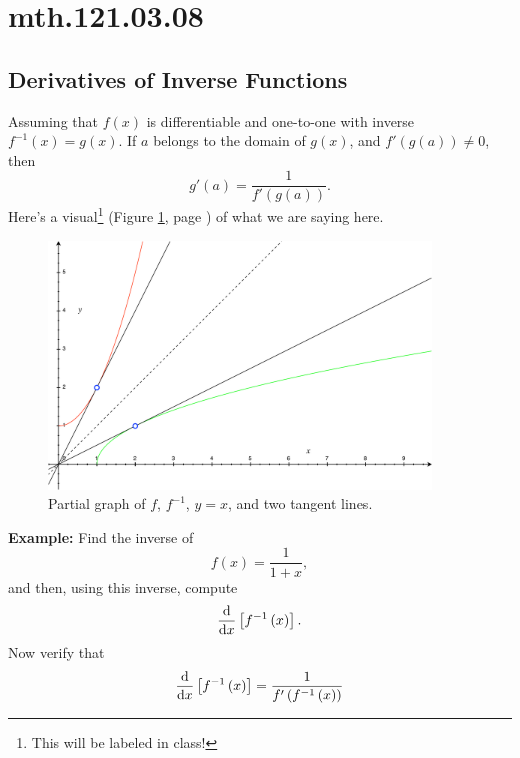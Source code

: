 \documentclass[12pt,addpoints, answers, fleqn]{exam}
\begin{document}
\section{mth.121.03.08}
\subsection{Derivatives of Inverse Functions}


Assuming that $f\left(x\right)$ is differentiable and one-to-one with inverse $f^{-1}\left(x\right) = g \left( x \right)$. If $a$ belongs to the domain of $g\left(x\right)$, and $f'\left(g\left(a\right)\right) \neq 0$, then
\[
g'\left(a\right) = \frac{1}{f'\left(g\left(a\right)\right)}.
\]
Here's a visual\footnote{This will be labeled in class!} (Figure \ref{fig:graph1606}, page \pageref{fig:graph1606}) of what we are saying here.
\begin{figure}[htbp] %
   \centering
   \includegraphics[width=4in]{./graphics/graph1606.pdf} 
   \caption{Partial graph of $f$, $f^{-1}$, $y=x$, and two tangent lines.}
   \label{fig:graph1606}
\end{figure}



\textbf{Example:} Find the inverse of
\[
f\left( x \right) = \frac{1}{1+x},
\]
and then, using this inverse, compute
\[
\frac{{\rm{d}}}{{\rm{d}}x} \left[ f^{-1} \left( x \right) \right].
\]
Now verify that
\[
\frac{{\rm{d}}}{{\rm{d}}x} \left[ f^{-1} \left( x \right) \right] = \frac{1}{f'\left( f^{-1} \left( x \right) \right)}
\]
\end{document}
